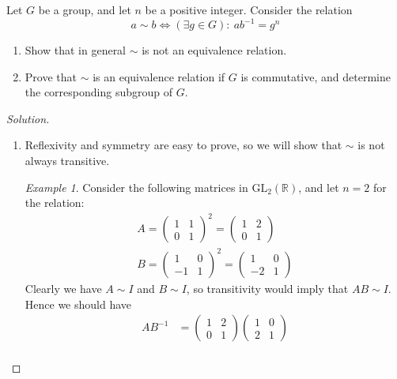 \documentclass[12pt]{article}
\newenvironment{problem}[2][Problem]{\begin{trivlist}
\item[\hskip \labelsep {\bfseries #1}\hskip \labelsep {\bfseries #2.}]}{\end{trivlist}}
\newenvironment{solution}
  {\renewcommand\qedsymbol{$\blacksquare$}\begin{proof}[Solution]}
{\end{proof}}
\theoremstyle{remark}
\newtheorem*{exmp}{Example}
\begin{document}
\begin{problem}{7.6}
  Let $G$ be a group, and let $n$ be a positive integer.
  Consider the relation
  \begin{equation*}
    a\sim b \Leftrightarrow (\exists g\in G){:}~ab^{-1} = g^n
  \end{equation*}
  \begin{enumerate}
    \item Show that in general $\sim$ is not an equivalence relation.
    \item Prove that $\sim$ is an equivalence relation if $G$ is commutative, 
      and determine the corresponding subgroup of $G$.
  \end{enumerate}
  \begin{solution}~
    \begin{enumerate}
      \item Reflexivity and symmetry are easy to prove, so we will show that $\sim$ is not always transitive.
        \begin{exmp}
          Consider the following matrices in $\text{GL}_2(\mathbb{R})$, and let $n=2$ for the relation:
          \begin{align*}
            A = \begin{pmatrix} 1 & 1 \\ 0 & 1 \end{pmatrix}^2 
              = \begin{pmatrix} 1 & 2 \\ 0 & 1 \end{pmatrix}  \\
            B = \begin{pmatrix} 1 & 0 \\ -1 & 1 \end{pmatrix}^2 
              = \begin{pmatrix} 1 & 0 \\ -2 & 1 \end{pmatrix} 
          \end{align*}
          Clearly we have $A\sim I$ and $B\sim I$, so transitivity would imply that $AB\sim I$.
          Hence we should have
          \begin{align*}
            AB^{-1} &= \begin{pmatrix} 1&2\\0&1 \end{pmatrix}\begin{pmatrix}1&0\\2&1\end{pmatrix} \\

\end{align*}
\end{exmp}
\end{enumerate}
\end{solution}
\end{problem}
\end{document}

